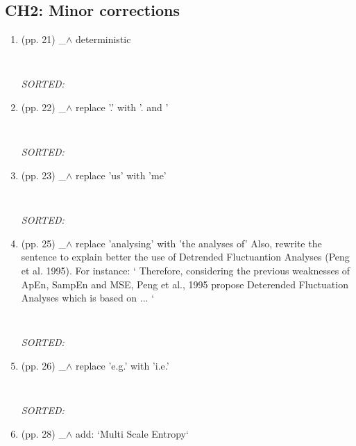 \documentclass[12pt]{article}
\begin{document}
\subsection{CH2: Minor corrections}
\begin{enumerate}

\item  (pp. 21)  \_$\wedge$  
	deterministic
	\begin{verbatim}
	
	\end{verbatim}
	\textit{
	SORTED:  
	}
	\\

\item  (pp. 22)  \_$\wedge$  
	replace '.' with '. and '
	\begin{verbatim}
	
	\end{verbatim}
	\textit{
	SORTED:  
	}
	\\

\item  (pp. 23)  \_$\wedge$  
	replace 'us' with 'me'
	\begin{verbatim}
	
	\end{verbatim}
	\textit{
	SORTED:  
	}
	\\

\item  (pp. 25)  \_$\wedge$  
	replace 'analysing'  with  'the analyses of'
	Also, rewrite the sentence to explain better the 
	use of Detrended Fluctuantion Analyses (Peng et al. 1995).
	For instance:
	`
	Therefore, considering the previous weaknesses of 
	ApEn, SampEn and MSE, Peng et al., 1995 propose
	Deterended Fluctuation Analyses which is based on ...
	`
	\begin{verbatim}
	
	\end{verbatim}
	\textit{
	SORTED:  
	}
	\\



\item  (pp. 26)  \_$\wedge$  
	replace 'e.g.' with 'i.e.'
	\begin{verbatim}
	
	\end{verbatim}
	\textit{
	SORTED:  
	}
	\\


\item  (pp. 28)  \_$\wedge$  
	add: `Multi Scale Entropy`
	\begin{verbatim}
	

\end{verbatim}
\end{enumerate}
\end{document}
